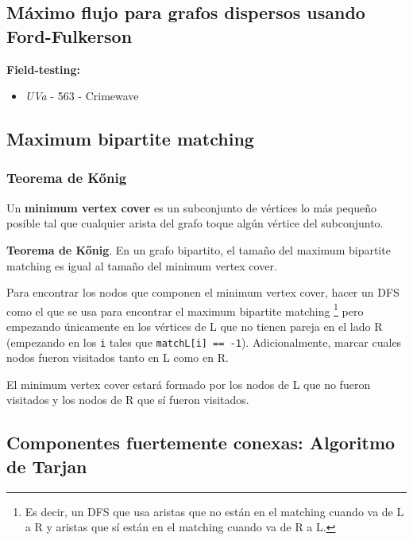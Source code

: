 \documentclass[10pt,letterpaper,twocolumn]{article}
\newcommand{\codigofuente}[1]{

\dotfill
}
\begin{document}
\codigofuente{./src/grafos/ford_fulkerson.cpp}

\subsection{Máximo flujo para grafos dispersos usando Ford-Fulkerson}

\small
\textbf{Field-testing:}
\begin{itemize}
\item \emph{UVa} - 563 - Crimewave
\end{itemize}
\normalsize

\codigofuente{./src/grafos/ford_fulkerson_sparse.cpp}

\subsection{Maximum bipartite matching}
\codigofuente{./src/grafos/maximum_bipartite_matching.cpp}

\subsubsection{Teorema de Kőnig}

Un \textbf{minimum vertex cover} es un subconjunto de vértices lo más pequeño posible tal que cualquier arista del grafo toque algún vértice del subconjunto.

\textbf{Teorema de Kőnig}. En un grafo bipartito, el tamaño del maximum bipartite matching es igual al tamaño del minimum vertex cover.

\medskip

Para encontrar los nodos que componen el minimum vertex cover, hacer un DFS como el que se usa para encontrar el maximum bipartite matching \footnote{Es decir, un DFS que usa aristas que no están en el matching cuando va de L a R y aristas que sí están en el matching cuando va de R a L.} pero empezando únicamente en los vértices de L que no tienen pareja en el lado R (empezando en los \texttt{i} tales que \texttt{matchL[i] == -1}). Adicionalmente, marcar cuales nodos fueron visitados tanto en L como en R.

El minimum vertex cover estará formado por los nodos de L que no fueron visitados y los nodos de R que sí fueron visitados.

\codigofuente{./src/grafos/konig.cpp}

\subsection{Componentes fuertemente conexas: Algoritmo de Tarjan}
\label{tarjan}
\codigofuente{./src/grafos/tarjan.cpp}
\end{document}
